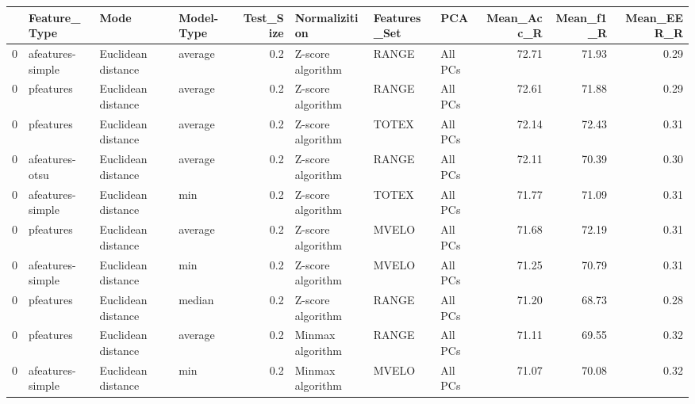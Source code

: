 \begin{tabular}{llllrlllrrr}
\toprule
{} &      Feature\_Type &                Mode & Model-Type &  Test\_Size &      Normalizition & Features\_Set &      PCA &  Mean\_Acc\_R &  Mean\_f1\_R &  Mean\_EER\_R \\
\midrule
0 &  afeatures-simple &  Euclidean distance &    average &        0.2 &  Z-score algorithm &        RANGE &  All PCs &       72.71 &      71.93 &        0.29 \\
0 &         pfeatures &  Euclidean distance &    average &        0.2 &  Z-score algorithm &        RANGE &  All PCs &       72.61 &      71.88 &        0.29 \\
0 &         pfeatures &  Euclidean distance &    average &        0.2 &  Z-score algorithm &        TOTEX &  All PCs &       72.14 &      72.43 &        0.31 \\
0 &    afeatures-otsu &  Euclidean distance &    average &        0.2 &  Z-score algorithm &        RANGE &  All PCs &       72.11 &      70.39 &        0.30 \\
0 &  afeatures-simple &  Euclidean distance &        min &        0.2 &  Z-score algorithm &        TOTEX &  All PCs &       71.77 &      71.09 &        0.31 \\
0 &         pfeatures &  Euclidean distance &    average &        0.2 &  Z-score algorithm &        MVELO &  All PCs &       71.68 &      72.19 &        0.31 \\
0 &  afeatures-simple &  Euclidean distance &        min &        0.2 &  Z-score algorithm &        MVELO &  All PCs &       71.25 &      70.79 &        0.31 \\
0 &         pfeatures &  Euclidean distance &     median &        0.2 &  Z-score algorithm &        RANGE &  All PCs &       71.20 &      68.73 &        0.28 \\
0 &         pfeatures &  Euclidean distance &    average &        0.2 &   Minmax algorithm &        RANGE &  All PCs &       71.11 &      69.55 &        0.32 \\
0 &  afeatures-simple &  Euclidean distance &        min &        0.2 &   Minmax algorithm &        MVELO &  All PCs &       71.07 &      70.08 &        0.32 \\
\bottomrule
\end{tabular}
